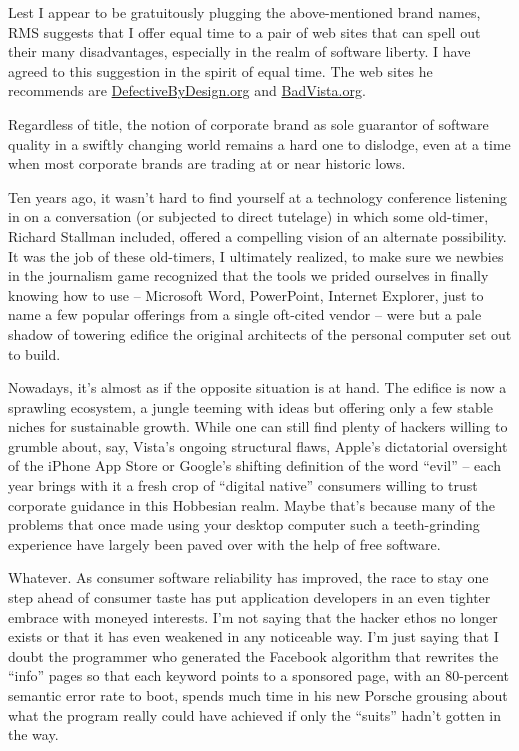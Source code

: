Lest I appear to be gratuitously plugging the above-mentioned brand
names, RMS suggests that I offer equal time to a pair of web sites that
can spell out their many disadvantages, especially in the realm of
software liberty. I have agreed to this suggestion in the spirit of
equal time. The web sites he recommends are \url{DefectiveByDesign.org}
and \url{BadVista.org}.

Regardless of title, the notion of corporate brand as sole guarantor  
of software quality in a swiftly changing world remains a hard one to  
dislodge, even at a time when most corporate brands are trading at or  
near historic lows.

Ten years ago, it wasn't hard to find yourself at a technology
conference listening in on a conversation (or subjected to direct
tutelage) in which some old-timer, Richard Stallman included, offered
a compelling vision of an alternate possibility. It was the job of
these old-timers, I ultimately realized, to make sure we newbies in
the journalism game recognized that the tools we prided ourselves in
finally knowing how to use -- Microsoft Word, PowerPoint, Internet
Explorer, just to name a few popular offerings from a single oft-cited
vendor -- were but a pale shadow of towering edifice the original
architects of the personal computer set out to build.

Nowadays, it's almost as if the opposite situation is at hand. The
edifice is now a sprawling ecosystem, a jungle teeming with ideas but
offering only a few stable niches for sustainable growth. While one
can still find plenty of hackers willing to grumble about, say,
Vista's ongoing structural flaws, Apple's dictatorial oversight of the
iPhone App Store or Google's shifting definition of the word ``evil''
-- each year brings with it a fresh crop of ``digital native''
consumers willing to trust corporate guidance in this Hobbesian realm.
Maybe that's because many of the problems that once made using your
desktop computer such a teeth-grinding experience have largely been
paved over with the help of free software.

Whatever. As consumer software reliability has improved, the race to
stay one step ahead of consumer taste has put application developers
in an even tighter embrace with moneyed interests. I'm not saying that
the hacker ethos no longer exists or that it has even weakened in any
noticeable way. I'm just saying that I doubt the programmer who
generated the Facebook algorithm that rewrites the ``info'' pages so
that each keyword points to a sponsored page, with an 80-percent
semantic error rate to boot, spends much time in his new Porsche
grousing about what the program really could have achieved if only the
``suits'' hadn't gotten in the way.

